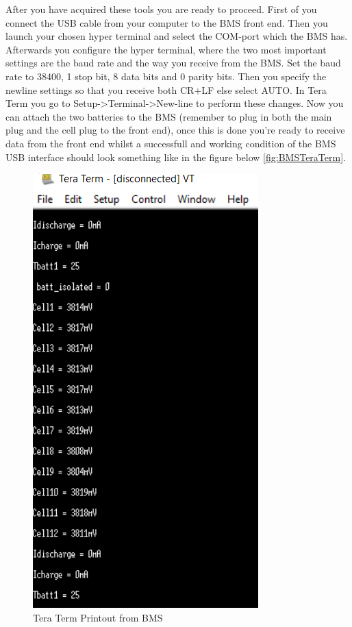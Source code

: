 After you have acquired these tools you are ready to proceed. First of you connect the USB cable from your computer to the BMS front end. Then you launch your chosen hyper terminal and select the COM-port which the BMS has. Afterwards you configure the hyper terminal, where the two most important settings are the baud rate and the way you receive from the BMS. Set the baud rate to 38400, 1 stop bit, 8 data bits and 0 parity bits. Then you specify the newline settings so that you receive both CR+LF else select AUTO. In Tera Term you go to Setup->Terminal->New-line to perform these changes. 
Now you can attach the two batteries to the BMS (remember to plug in both the main plug and the cell plug to the front end), once this is done you're ready to receive data from the front end whilst a successfull and working condition of the BMS USB interface should look something like in the figure below \vref{fig:BMSTeraTerm}. 
\begin{figure}[H]
	\centering
	\includegraphics[width=0.6\linewidth]{Hardware/Pictures/BMS_teraterm}
	\caption{Tera Term Printout from BMS}
	\label{fig:BMSTeraTerm}
\end{figure}

